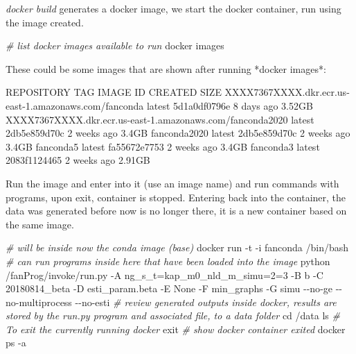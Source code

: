 \documentclass[
]{book}
\newenvironment{Shaded}{\begin{snugshade}}{\end{snugshade}}
\newcommand{\BuiltInTok}[1]{#1}
\newcommand{\CommentTok}[1]{\textcolor[rgb]{0.56,0.35,0.01}{\textit{#1}}}
\newcommand{\ExtensionTok}[1]{#1}
\newcommand{\FunctionTok}[1]{\textcolor[rgb]{0.00,0.00,0.00}{#1}}
\newcommand{\NormalTok}[1]{#1}
\begin{document}
\emph{docker build} generates a docker image, we start the docker container, run using the image created.

\begin{Shaded}
\begin{Highlighting}[]
\CommentTok{\# list docker images available to run}
\ExtensionTok{docker}\NormalTok{ images}
\end{Highlighting}
\end{Shaded}

\begin{Shaded}
\begin{Highlighting}[]
\ExtensionTok{These}\NormalTok{ could be some images that are shown after running *docker images*:}

\ExtensionTok{REPOSITORY}\NormalTok{                                                     TAG                 IMAGE ID            CREATED             SIZE}
\ExtensionTok{XXXX7367XXXX.dkr.ecr.us{-}east{-}1.amazonaws.com/fanconda}\NormalTok{       latest              5d1a0df0796e        8 days ago          3.52GB}
\ExtensionTok{XXXX7367XXXX.dkr.ecr.us{-}east{-}1.amazonaws.com/fanconda2020}\NormalTok{   latest              2db5e859d70c        2 weeks ago         3.4GB}
\ExtensionTok{fanconda2020}\NormalTok{                                                latest              2db5e859d70c        2 weeks ago         3.4GB}
\ExtensionTok{fanconda5}\NormalTok{                                                   latest              fa55672e7753        2 weeks ago         3.4GB}
\ExtensionTok{fanconda3}\NormalTok{                                                   latest              2083f1124465        2 weeks ago         2.91GB}
\end{Highlighting}
\end{Shaded}

Run the image and enter into it (use an image name) and run commands with programs, upon exit, container is stopped. Entering back into the container, the data was generated before now is no longer there, it is a new container based on the same image.

\begin{Shaded}
\begin{Highlighting}[]
\CommentTok{\# will be inside now the conda image (base)}
\ExtensionTok{docker}\NormalTok{ run {-}t {-}i fanconda /bin/bash}
\CommentTok{\# can run programs inside here that have been loaded into the image}
\ExtensionTok{python}\NormalTok{ /fanProg/invoke/run.py {-}A ng\_s\_t=kap\_m0\_nld\_m\_simu=2=3 {-}B b {-}C 20180814\_beta {-}D esti\_param.beta {-}E None {-}F min\_graphs {-}G simu {-}{-}no{-}ge {-}{-}no{-}multiprocess {-}{-}no{-}esti}
\CommentTok{\# review generated outputs inside docker, results are stored by the run.py program and associated file, to a data folder}
\BuiltInTok{cd}\NormalTok{ /data}
\FunctionTok{ls}
\CommentTok{\# To exit the currently running docker}
\BuiltInTok{exit}
\CommentTok{\# show docker container exited}
\ExtensionTok{docker}\NormalTok{ ps {-}a}
\end{Highlighting}
\end{Shaded}
\end{document}
